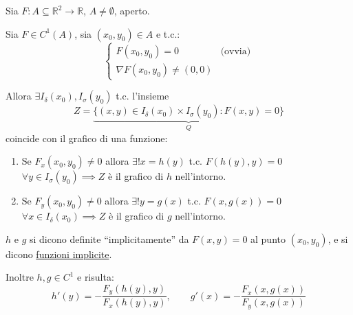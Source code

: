 \begin{theorem}
Sia $F : A \subseteq \mathbb{R}^2 \to \mathbb{R}$, $A \neq \emptyset$, aperto.

Sia $F \in C^1(A)$, sia $(x_0, y_0) \in A$ e t.c.:
\[
\begin{cases}
F(x_0, y_0) = 0 & \text{(ovvia)} \\
\nabla F(x_0, y_0) \neq (0, 0)
\end{cases}
\]

Allora $\exists I_\delta(x_0), I_\sigma(y_0)$ t.c. l'insieme
\[
Z = \underbrace{\{ (x, y) \in I_\delta(x_0) \times I_\sigma(y_0) : F(x, y) = 0 \}}_{Q}
\]
coincide con il grafico di una funzione:

\begin{center}
\end{center}

\begin{enumerate}
    \item Se $F_x(x_0, y_0) \neq 0$ allora $\exists! x = h(y)$ t.c. $F(h(y), y) = 0$ $\forall y \in I_\sigma(y_0) \implies Z$ è il grafico di $h$ nell'intorno.
    \item Se $F_y(x_0, y_0) \neq 0$ allora $\exists! y = g(x)$ t.c. $F(x, g(x)) = 0$ $\forall x \in I_\delta(x_0) \implies Z$ è il grafico di $g$ nell'intorno.
\end{enumerate}

$h$ e $g$ si dicono definite ``implicitamente'' da $F(x, y) = 0$ al punto $(x_0, y_0)$, e si dicono \underline{funzioni implicite}.

Inoltre $h, g \in C^1$ e risulta:
\[
h'(y) = -\frac{F_y(h(y), y)}{F_x(h(y), y)}, \qquad g'(x) = -\frac{F_x(x, g(x))}{F_y(x, g(x))}
\]
\end{theorem}

